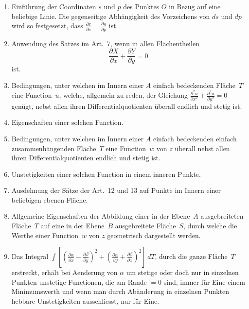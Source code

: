 \documentclass[a4paper,12pt]{article}
\begin{document}
\begin{enumerate}
\item
Einf\"{u}hrung der Coordinaten $s$ und $p$ des Punktes $O$ in
Bezug auf eine beliebige Linie.  Die gegenseitige
Abh\"{a}ngigkeit des Vorzeichens von $ds$ und $dp$ wird so
festgesetzt, dass
$\displaystyle
   \frac{\partial x}{\partial s} = \frac{\partial y}{\partial p}$
ist.

\item
Anwendung des Satzes im Art.~7, wenn in allen Fl\"{a}chentheilen
\[ \frac{\partial X}{\partial x} + \frac{\partial Y}{\partial y}
   = 0 \]
ist.

\item
Bedingungen, unter welchen im Innern einer $A$ einfach
bedeckenden Fl\"{a}che~$T$ eine Function~$u$, welche, allgemein
zu reden, der Gleichung
$\displaystyle
   \frac{\partial^2 u}{\partial x^2}
      + \frac{\partial^2 u}{\partial y^2}
   = 0$
gen\"{u}gt, nebst allen ihren Differentialquotienten \"{u}berall
endlich und stetig ist.

\item
Eigenschaften einer solchen Function.

\item
Bedingungen, unter welchen im Innern einer $A$ einfach
bedeckenden einfach zusammenh\"{a}ngenden Fl\"{a}che~$T$ eine
Function~$w$ von $z$ \"{u}berall nebst allen ihren
Differentialquotienten endlich und stetig ist.

\item
Unstetigkeiten einer solchen Function in einem inneren Punkte.

\item
Ausdehnung der S\"{a}tze der Art.~12 und 13 auf Punkte im Innern
einer beliebigen ebenen Fl\"{a}che.

\item
Allgemeine Eigenschaften der Abbildung einer in der Ebene~$A$
ausgebreiteten Fl\"{a}che~$T$ auf eine in der Ebene~$B$
ausgebreitete Fl\"{a}che~$S$, durch welche die Werthe einer
Function~$w$ von $z$ geometrisch dargestellt werden.

\item
Das Integral
$\displaystyle \int
      \left[
         \left(
            \frac{\partial \alpha}{\partial x}
          - \frac{\partial \beta }{\partial y}
         \right)^2
       + \left(
            \frac{\partial \alpha}{\partial y}
          + \frac{\partial \beta }{\partial x}
         \right)^2
      \right] \, dT$,
durch die ganze Fl\"{a}che~$T$ erstreckt, erh\"{a}lt bei
Aenderung von $\alpha$ um stetige oder doch nur in einzelnen
Punkten unstetige Functionen, die am Rande $= 0$ sind, immer
f\"{u}r Eine einem Minimumswerth und wenn man durch
Ab\"{a}nderung in einzelnen Punkten hebbare Unstetigkeiten
ausschliesst, nur f\"{u}r Eine.


\end{enumerate}
\end{document}
